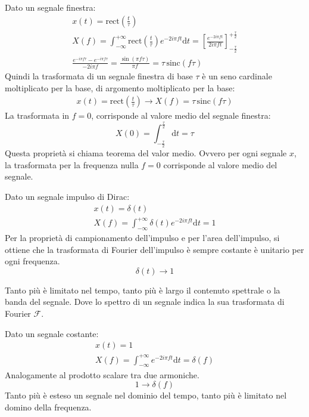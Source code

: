 \documentclass{article}
\newcommand{\rect}{\mathrm{rect}}
\newcommand{\sinc}{\mathrm{sinc}}
\newcommand{\df}{\mathrm{d}}
\numberwithin{equation}{subsection}
\begin{document}
Dato un segnale finestra:
\begin{gather*}
    x(t)=\rect\displaystyle\left(\frac{t}{\tau}\right)\\
    X(f)=\displaystyle\int_{-\infty}^{+\infty}\rect\left(\frac{t}{\tau}\right)e^{-2i\pi ft}\df t=\left[\frac{e^{-2i\pi ft}}{2i\pi ft}\right]^{+\frac{\tau}{2}}_{-\frac{\tau}{2}}\\
    \displaystyle\frac{e^{-i\pi f\tau}-e^{-i\pi f\tau}}{-2i\pi f}=\frac{\sin(\pi f\tau)}{\pi f}=\tau\,\sinc(f\tau)
\end{gather*}
Quindi la trasformata di un segnale finestra di base $\tau$ è un seno cardinale moltiplicato per la base, di argomento moltiplicato per la base:
\begin{gather}
    x(t)=\rect\displaystyle\left(\frac{t}{\tau}\right)\rightarrow X(f)=\tau\,\sinc(f\tau)
\end{gather}
La trasformata in $f=0$, corrisponde al valore medio del segnale finestra:
\begin{equation*}
    X(0)=\displaystyle\int_{-\frac{\tau}{2}}^{\frac{\tau}{2}}\df t=\tau
\end{equation*}
Questa proprietà si chiama teorema del valor medio. Ovvero per ogni segnale $x$, la trasformata per la frequenza nulla $f=0$ corrisponde al valore medio del segnale. 



Dato un segnale impulso di Dirac:
\begin{gather*}
    x(t)=\delta(t)\\
    X(f)=\displaystyle\int_{-\infty}^{+\infty}\delta(t)e^{-2i\pi ft}\df t=1
\end{gather*}
Per la proprietà di campionamento dell'impulso e per l'area dell'impulso, si ottiene che la trasformata di Fourier dell'impulso è sempre costante è unitario per ogni frequenza. 
\begin{equation}
    \delta(t)\to1
\end{equation}

Tanto più è limitato nel tempo, tanto più è largo il contenuto spettrale o la banda del segnale. Dove lo spettro di un segnale indica la sua trasformata di Fourier 
$\mathscr{F}$. 


Dato un segnale costante:
\begin{gather*}
    x(t)=1\\
    X(f)=\displaystyle\int_{-\infty}^{+\infty}e^{-2i\pi ft}\df t=\delta (f)
\end{gather*}
Analogamente al prodotto scalare tra due armoniche. 
\begin{equation}
    1\to\delta(f)
\end{equation}
Tanto più è esteso un segnale nel dominio del tempo, tanto più è limitato nel domino della frequenza. 
\end{document}
